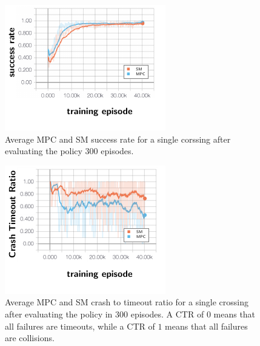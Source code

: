 \begin{figure}[t!]
	\centering
	\includegraphics[width=\columnwidth]{figures/figures-successrate.pdf}
	\vspace{-3.5em}
	\caption{Average MPC and SM success rate for a single corssing after evaluating the policy 300 episodes.}
	\label{fig:result1}
\end{figure}

\begin{figure}[t!]
	\centering
	\includegraphics[width=\columnwidth]{figures/figures-crashratio.pdf}
	\vspace{-4em}
	\caption{Average MPC and SM crash to timeout ratio for a single crossing after evaluating the policy in 300 episodes. A CTR of $0$ means that all failures are timeouts, while a CTR of $1$ means that all failures are collisions.}
	\label{fig:result2}
\end{figure}

